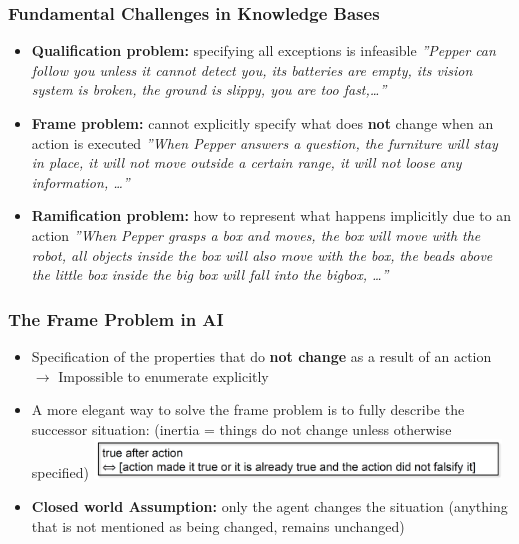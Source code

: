\documentclass[conference]{styles/acmsiggraph}
\begin{document}
        \subsubsection{Fundamental Challenges in Knowledge Bases}
            \begin{itemize}
                \item \textbf{Qualification problem:} specifying all exceptions is infeasible\newline
                    \textit{''Pepper can follow you unless it cannot detect you, its batteries are empty, its vision system is broken, the ground is slippy, you are too fast,…''}
                \item \textbf{Frame problem:} cannot explicitly specify what does \textbf{not} change when an action is executed\newline
                    \textit{''When Pepper answers a question, the furniture will stay in place, it will not move outside a certain range, it will not loose any information, …''}
                \item \textbf{Ramification problem:} how to represent what happens implicitly due to an action
                    \textit{''When Pepper grasps a box and moves, the box will move with the robot, all objects inside the box will also move with the box, the beads above the little box inside the big box will fall into the bigbox, …''}
            \end{itemize}
        
        \subsubsection{The Frame Problem in AI}
            \begin{itemize}
                \item Specification of the properties that do \textbf{not change} as a result of an action\newline
                    $\rightarrow$ Impossible to enumerate explicitly
                \item A more elegant way to solve the frame problem is to fully describe the successor situation: (inertia = things do not change unless otherwise specified)\newline
                    \includegraphics[width=0.85\textwidth]{imgs/FrameProblemInAI.png}
                \item \textbf{Closed world Assumption:} only the agent changes the situation (anything that is not mentioned as being changed, remains unchanged)
            \end{itemize}
    
\end{document}
